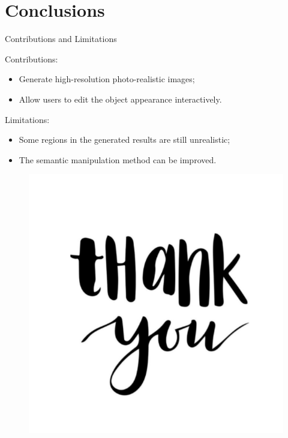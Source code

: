 \documentclass{beamer}
\begin{document}
\section{Conclusions}
\begin{frame}{Contributions and Limitations}
%
%
\begin{beamerboxesrounded}[upper=uppercol,lower=lowercol,shadow=false]{	Contributions: }

\begin{itemize}
	
	\item
	Generate high-resolution photo-realistic images;
	\item
	Allow users to edit the object appearance interactively.
\end{itemize}
\end{beamerboxesrounded}%
%


\begin{beamerboxesrounded}[upper=uppercol,lower=lowercol,shadow=false]{	Limitations: }

\begin{itemize}
	
	\item
	Some regions in the generated results are still unrealistic;
	\item
	The semantic manipulation method can  be improved.
\end{itemize}
\end{beamerboxesrounded}


\end{frame}

\begin{frame}
\begin{figure}
	\centering
	\includegraphics[height=0.6\textheight]{images/Theend}
\end{figure}
\end{frame}
\end{document}
